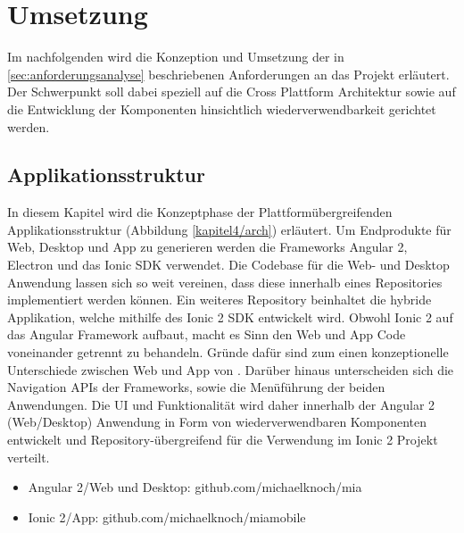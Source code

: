 
\chapter{Umsetzung}
\label{chap:umsetzung}

Im nachfolgenden wird die Konzeption und Umsetzung der in \ref{sec:anforderungsanalyse}
beschriebenen Anforderungen an das Projekt \projectname{} erläutert.
Der Schwerpunkt soll dabei speziell auf die Cross Plattform Architektur sowie auf die
Entwicklung der Komponenten hinsichtlich wiederverwendbarkeit gerichtet werden.


\section{Applikationsstruktur}

In diesem Kapitel wird die Konzeptphase der Plattformübergreifenden Applikationsstruktur
(Abbildung \ref{kapitel4/arch}) erläutert.
Um Endprodukte für Web, Desktop und App zu generieren werden die Frameworks Angular 2, Electron und das
Ionic \ac{SDK} verwendet. Die Codebase für die Web- und Desktop Anwendung lassen sich so weit vereinen,
dass diese innerhalb eines Repositories implementiert werden können.
Ein weiteres Repository beinhaltet die hybride Applikation,
welche mithilfe des Ionic 2 \ac{SDK} entwickelt wird. Obwohl Ionic 2 auf das Angular Framework aufbaut,
macht es Sinn den Web und App Code voneinander getrennt zu behandeln.
Gründe dafür sind zum einen konzeptionelle Unterschiede zwischen Web und App von \projectname{}.
Darüber hinaus unterscheiden sich die Navigation APIs der Frameworks, sowie die Menüführung der beiden Anwendungen.
Die \ac{UI} und Funktionalität wird daher innerhalb der Angular 2 (Web/Desktop)
Anwendung in Form von wiederverwendbaren Komponenten entwickelt und
Repository-übergreifend für die Verwendung im Ionic 2 Projekt verteilt.

\begin{itemize}
  \item Angular 2/Web und Desktop: github.com/michaelknoch/mia
  \item Ionic 2/App: github.com/michaelknoch/miamobile
\end{itemize}



